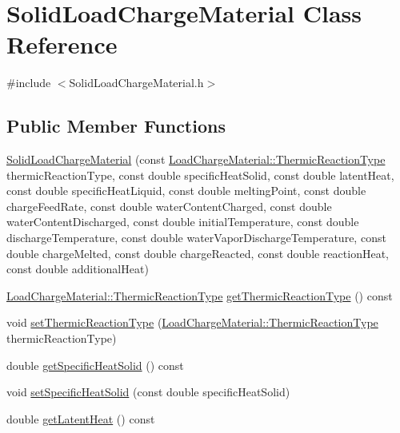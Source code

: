 \hypertarget{class_solid_load_charge_material}{}\section{Solid\+Load\+Charge\+Material Class Reference}
\label{class_solid_load_charge_material}


{\ttfamily \#include $<$Solid\+Load\+Charge\+Material.\+h$>$}

\subsection*{Public Member Functions}
\begin{DoxyCompactItemize}
\item 
\hyperlink{class_solid_load_charge_material_a9145db5518b94cfc1919b8d6ff809f5e}{Solid\+Load\+Charge\+Material} (const \hyperlink{class_load_charge_material_a51d4263e865a5d86236622dd3fe23fd1}{Load\+Charge\+Material\+::\+Thermic\+Reaction\+Type} thermic\+Reaction\+Type, const double specific\+Heat\+Solid, const double latent\+Heat, const double specific\+Heat\+Liquid, const double melting\+Point, const double charge\+Feed\+Rate, const double water\+Content\+Charged, const double water\+Content\+Discharged, const double initial\+Temperature, const double discharge\+Temperature, const double water\+Vapor\+Discharge\+Temperature, const double charge\+Melted, const double charge\+Reacted, const double reaction\+Heat, const double additional\+Heat)
\item 
\hyperlink{class_load_charge_material_a51d4263e865a5d86236622dd3fe23fd1}{Load\+Charge\+Material\+::\+Thermic\+Reaction\+Type} \hyperlink{class_solid_load_charge_material_a11708312a99ab985d980e1e521e0864c}{get\+Thermic\+Reaction\+Type} () const
\item 
void \hyperlink{class_solid_load_charge_material_ae2f85e0fbeff9f72b808bf86e645797f}{set\+Thermic\+Reaction\+Type} (\hyperlink{class_load_charge_material_a51d4263e865a5d86236622dd3fe23fd1}{Load\+Charge\+Material\+::\+Thermic\+Reaction\+Type} thermic\+Reaction\+Type)
\item 
double \hyperlink{class_solid_load_charge_material_af84f1f7dd167f67c0c02206339bbfe27}{get\+Specific\+Heat\+Solid} () const
\item 
void \hyperlink{class_solid_load_charge_material_ad9d2e3668a6a14700f4dced4882f98c0}{set\+Specific\+Heat\+Solid} (const double specific\+Heat\+Solid)
\item 
double \hyperlink{class_solid_load_charge_material_add60191bd282a9cefa4bf7a60301711b}{get\+Latent\+Heat} () const

\end{DoxyCompactItemize}
